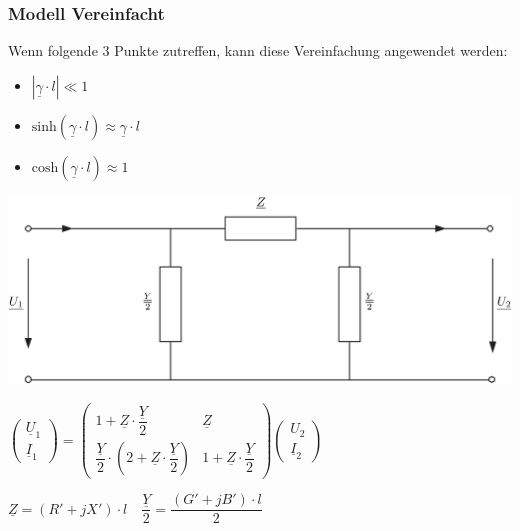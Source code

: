 \subsubsection{Modell Vereinfacht}

Wenn folgende 3 Punkte zutreffen, kann diese Vereinfachung angewendet werden:\\
\begin{itemize}
    \item $| \underline{\gamma } \cdot l | \ll 1$
    \item $\text{sinh}(\underline{\gamma } \cdot l) \approx \underline{\gamma } \cdot l$
    \item $\text{cosh}(\underline{\gamma } \cdot l) \approx 1$
\end{itemize}

\includegraphics[width=0.98\columnwidth, align=c]{images/Leitungsgleichungen_2.png}

\vspace{0.15cm}

$\boxed{
\begin{pmatrix}
    \underline{U}_1 \\
    \underline{I}_1
    \end{pmatrix}
    =
    \begin{pmatrix}
    1 + \underline{Z} \cdot \dfrac{\underline{Y}}{2} & \underline{Z} \\
    \dfrac{\underline{Y}}{2} \cdot \left( 2 + \underline{Z} \cdot \dfrac{\underline{Y}}{2} \right) & 1 + \underline{Z} \cdot \dfrac{\underline{Y}}{2}
    \end{pmatrix}
    \begin{pmatrix}
    U_2 \\
    \underline{I}_2
\end{pmatrix}
}
$

\vspace{0.15cm}

$
\boxed{
    \underline{Z} = (R' + jX') \cdot l
}
\quad
\boxed{
    \dfrac{\underline{Y}}{2} = \dfrac{(G' + jB') \cdot l}{2}
}
$


